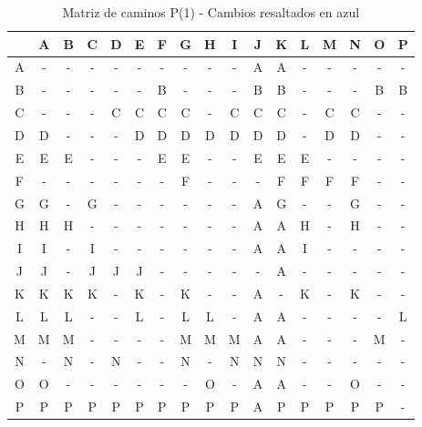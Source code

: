 \documentclass[12pt]{article}
\begin{document}
\begin{table}[h!]
\centering
\begin{tabular}{|c|c|c|c|c|c|c|c|c|c|c|c|c|c|c|c|c|}
\hline
 & A & B & C & D & E & F & G & H & I & J & K & L & M & N & O & P \\\hline
A & - & - & - & - & - & - & - & - & - & A & A & - & - & - & - & - \\\hline
B & - & - & - & - & - & B & - & - & - & B & B & - & - & - & B & B \\\hline
C & - & - & - & C & C & C & C & - & C & C & C & - & C & C & - & - \\\hline
D & D & - & - & - & D & D & D & D & D & D & D & - & D & D & - & - \\\hline
E & E & E & - & - & - & E & E & - & - & E & E & E & - & - & - & - \\\hline
F & - & - & - & - & - & - & F & - & - & - & F & F & F & F & - & - \\\hline
G & G & - & G & - & - & - & - & - & - & \cellcolor{lightblue} A & G & - & - & G & - & - \\\hline
H & H & H & - & - & - & - & - & - & - & \cellcolor{lightblue} A & \cellcolor{lightblue} A & H & - & H & - & - \\\hline
I & I & - & I & - & - & - & - & - & - & \cellcolor{lightblue} A & \cellcolor{lightblue} A & I & - & - & - & - \\\hline
J & J & - & J & J & J & - & - & - & - & - & \cellcolor{lightblue} A & - & - & - & - & - \\\hline
K & K & K & K & - & K & - & K & - & - & \cellcolor{lightblue} A & - & K & - & K & - & - \\\hline
L & L & L & - & - & L & - & L & L & - & \cellcolor{lightblue} A & \cellcolor{lightblue} A & - & - & - & - & L \\\hline
M & M & M & - & - & - & - & M & M & M & \cellcolor{lightblue} A & \cellcolor{lightblue} A & - & - & - & M & - \\\hline
N & - & N & - & N & - & - & N & - & N & N & N & - & - & - & - & - \\\hline
O & O & - & - & - & - & - & - & O & - & \cellcolor{lightblue} A & \cellcolor{lightblue} A & - & - & O & - & - \\\hline
P & P & P & P & P & P & P & P & P & P & \cellcolor{lightblue} A & P & P & P & P & P & - \\\hline
\end{tabular}
\caption{Matriz de caminos P(1) - Cambios resaltados en azul}
\end{table}
\end{document}
